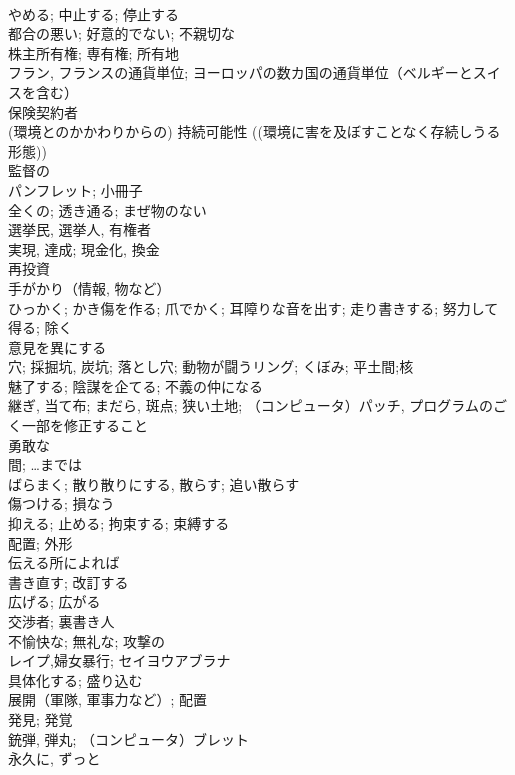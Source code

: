 \documentclass[8pt]{extreport}
\begin{document}
\begin{CJK}{UTF8}{min}
\\	やめる; 中止する; 停止する	
\\	都合の悪い; 好意的でない; 不親切な	
\\	株主所有権; 専有権; 所有地	
\\	フラン, フランスの通貨単位; ヨーロッパの数カ国の通貨単位（ベルギーとスイスを含む）	
\\	保険契約者	
\\	(環境とのかかわりからの) 持続可能性 ((環境に害を及ぼすことなく存続しうる形態))	
\\	監督の	
\\	パンフレット; 小冊子	
\\	全くの; 透き通る; まぜ物のない	
\\	選挙民, 選挙人, 有権者	
\\	実現, 達成; 現金化, 換金	
\\	再投資	
\\	手がかり（情報, 物など）	
\\	ひっかく; かき傷を作る; 爪でかく; 耳障りな音を出す; 走り書きする; 努力して得る; 除く	
\\	意見を異にする	
\\	穴; 採掘坑, 炭坑; 落とし穴; 動物が闘うリング; くぼみ; 平土間;核	
\\	魅了する; 陰謀を企てる; 不義の仲になる	
\\	継ぎ, 当て布; まだら, 斑点; 狭い土地; （コンピュータ）パッチ, プログラムのごく一部を修正すること	
\\	勇敢な	
\\	間; …までは	
\\	ばらまく; 散り散りにする, 散らす; 追い散らす	
\\	傷つける; 損なう	
\\	抑える; 止める; 拘束する; 束縛する	
\\	配置; 外形	
\\	伝える所によれば	
\\	書き直す; 改訂する	
\\	広げる; 広がる	
\\	交渉者; 裏書き人	
\\	不愉快な; 無礼な; 攻撃の	
\\	レイプ,婦女暴行; セイヨウアブラナ	
\\	具体化する; 盛り込む	
\\	展開（軍隊, 軍事力など）; 配置	
\\	発見; 発覚	
\\	銃弾, 弾丸; （コンピュータ）ブレット	
\\	永久に, ずっと	

\end{CJK}
\end{document}
